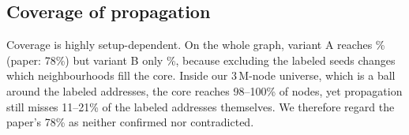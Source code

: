 \documentclass[11pt,a4paper]{article}
\begin{document}
\subsection{Coverage of propagation}
\begin{table}[H]
\centering\footnotesize

\caption{Share of addresses that propagation can embed (core members plus addresses with at least one core neighbour).}
\label{tab:cov}
\end{table}
Coverage is highly setup-dependent. On the whole graph, variant A reaches \CovA\% (paper: 78\%) but variant B only \CovB\%, because excluding the labeled seeds changes which neighbourhoods fill the core. Inside our 3\,M-node universe, which is a ball around the labeled addresses, the core reaches 98--100\% of nodes, yet propagation still misses 11--21\% of the labeled addresses themselves. We therefore regard the paper's 78\% as neither confirmed nor contradicted.
\end{document}
